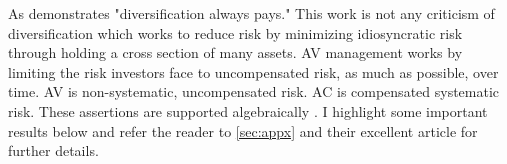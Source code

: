 As \citet{samuelson_general_1967} demonstrates "diversification always pays." This work is not any criticism of diversification which works to reduce risk by minimizing idiosyncratic risk through holding a cross section of many assets. AV management works by limiting the risk investors face to uncompensated risk, as much as possible, over time. AV is non-systematic, uncompensated risk. AC is compensated systematic risk. These assertions are supported algebraically \citet{pollet_average_2010}. I highlight some important results below and refer the reader to \ref{sec:appx} and their excellent article for further details. 

%
%
%
%
